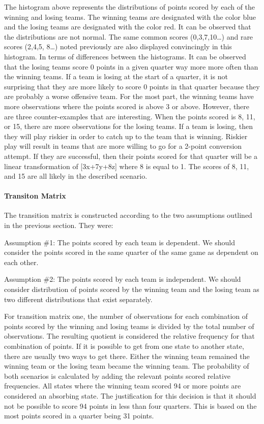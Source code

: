 \documentclass[
]{article}
\let\oldparagraph\paragraph
\renewcommand{\paragraph}[1]{\oldparagraph{#1}\mbox{}}
\begin{document}
The histogram above represents the distributions of points scored by
each of the winning and losing teams. The winning teams are designated
with the color blue and the losing teams are designated with the color
red. It can be observed that the distributions are not normal. The same
common scores (0,3,7,10\ldots{}) and rare scores (2,4,5, 8\ldots{})
noted previously are also displayed convincingly in this histogram. In
terms of differences between the histograms. It can be observed that the
losing teams score 0 points in a given quarter way more more often than
the winning teams. If a team is losing at the start of a quarter, it is
not surprising that they are more likely to score 0 points in that
quarter because they are probably a worse offensive team. For the most
part, the winning teams have more observations where the points scored
is above 3 or above. However, there are three counter-examples that are
interesting. When the points scored is 8, 11, or 15, there are more
observations for the losing teams. If a team is losing, then they will
play riskier in order to catch up to the team that is winning. Riskier
play will result in teams that are more willing to go for a 2-point
conversion attempt. If they are successful, then their points scored for
that quarter will be a linear transformation of {[}3x+7y+8z{]} where 8
is equal to 1. The scores of 8, 11, and 15 are all likely in the
described scenario.

\hypertarget{transiton-matrix}{%
\paragraph{Transiton Matrix}\label{transiton-matrix}}

The transition matrix is constructed according to the two assumptions
outlined in the previous section. They were:

Assumption \#1: The points scored by each team is dependent. We should
consider the points scored in the same quarter of the same game as
dependent on each other.

Assumption \#2: The points scored by each team is independent. We should
consider distribution of points scored by the winning team and the
losing team as two different distributions that exist separately.

For transition matrix one, the number of observations for each
combination of points scored by the winning and losing teams is divided
by the total number of observations. The resulting quotient is
considered the relative frequency for that combination of points. If it
is possible to get from one state to another state, there are usually
two ways to get there. Either the winning team remained the winning team
or the losing team became the winning team. The probability of both
scenarios is calculated by adding the relevant points scored relative
frequencies. All states where the winning team scored 94 or more points
are considered an absorbing state. The justification for this decision
is that it should not be possible to score 94 points in less than four
quarters. This is based on the most points scored in a quarter being 31
points.
\end{document}
